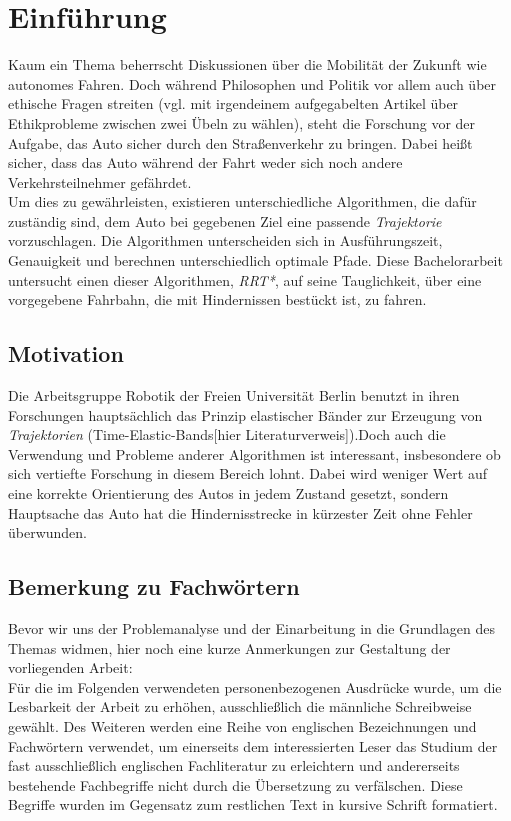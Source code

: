 \section{Einführung}
Kaum ein Thema beherrscht Diskussionen über die Mobilität der Zukunft wie autonomes Fahren. Doch während Philosophen und Politik vor allem auch über ethische Fragen streiten (vgl. mit irgendeinem aufgegabelten Artikel über Ethikprobleme zwischen zwei Übeln zu wählen), steht die Forschung vor der Aufgabe, das Auto sicher durch den Straßenverkehr zu bringen. Dabei heißt sicher, dass das Auto während der Fahrt weder sich noch andere Verkehrsteilnehmer gefährdet. \\
Um dies zu gewährleisten, existieren unterschiedliche Algorithmen, die dafür zuständig sind, dem Auto bei gegebenen Ziel eine passende \textit{Trajektorie} vorzuschlagen. Die Algorithmen unterscheiden sich in Ausführungszeit, Genauigkeit und berechnen unterschiedlich optimale Pfade. Diese Bachelorarbeit untersucht einen dieser Algorithmen, \textit{RRT*}, auf seine Tauglichkeit, über eine vorgegebene Fahrbahn, die mit Hindernissen bestückt ist, zu fahren. \\

\subsection{Motivation}
Die Arbeitsgruppe Robotik der Freien Universität Berlin benutzt in ihren Forschungen hauptsächlich das Prinzip elastischer Bänder zur Erzeugung von \textit{Trajektorien} (Time-Elastic-Bands[hier Literaturverweis]).Doch auch die Verwendung und Probleme anderer Algorithmen ist interessant, insbesondere ob sich vertiefte Forschung in diesem Bereich lohnt. Dabei wird weniger Wert auf eine korrekte Orientierung des Autos in jedem Zustand gesetzt, sondern Hauptsache das Auto hat die Hindernisstrecke in kürzester Zeit ohne Fehler überwunden.
\subsection{Bemerkung zu Fachwörtern}
Bevor wir uns der Problemanalyse und der Einarbeitung in die Grundlagen des Themas  widmen, hier noch eine kurze Anmerkungen zur Gestaltung der
vorliegenden Arbeit: \\
Für die im Folgenden verwendeten personenbezogenen
Ausdrücke wurde, um die Lesbarkeit der Arbeit zu erhöhen,
ausschließlich die männliche Schreibweise gewählt. Des Weiteren werden eine
Reihe von englischen Bezeichnungen und Fachwörtern verwendet, um einerseits dem
interessierten Leser das Studium der fast ausschließlich englischen
Fachliteratur zu erleichtern und andererseits bestehende Fachbegriffe nicht durch die Übersetzung zu verfälschen. Diese Begriffe
wurden im Gegensatz zum restlichen Text in kursive Schrift formatiert.
